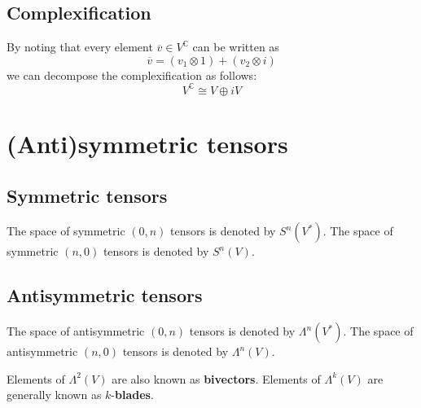 \subsection{Complexification}

	\begin{property}
		By noting that every element $\overline{v}\in V^{\mathbb{C}}$ can be written as \[\overline{v} = (v_1\otimes1) + (v_2\otimes i)\] we can decompose the complexification as follows:
		\begin{equation}
			V^{\mathbb{C}} \cong V\oplus iV
		\end{equation}
	\end{property}

\section{(Anti)symmetric tensors}
\subsection{Symmetric tensors}
	\begin{notation}
		The space of symmetric $(0,n)$ tensors is denoted by $S^n(V^*)$. The space of symmetric $(n, 0)$ tensors is denoted by $S^n(V)$.
	\end{notation}
    
\subsection{Antisymmetric tensors}
	\begin{notation}
		\label{tensor:not:antysimmetric_space}
		The space of antisymmetric $(0,n)$ tensors is denoted by $\Lambda^n(V^*)$. The space of antisymmetric $(n, 0)$ tensors is denoted by $\Lambda^n(V)$.
	\end{notation}
    \begin{remark*}
    	Elements of $\Lambda^2(V)$ are also known as \textbf{bivectors}. Elements of $\Lambda^k(V)$ are generally known as $k$-\textbf{blades}.
    \end{remark*}
    
